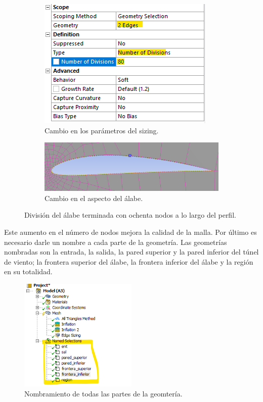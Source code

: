 \documentclass[12pt, letterpaper]{article}
\begin{document}
\begin{figure}[H]
	\centering
	\begin{subfigure}[b]{0.49\linewidth}
		\includegraphics[width=\linewidth]{14.png}
		\caption{Cambio en los parámetros del sizing.}
	\end{subfigure}
	\begin{subfigure}[b]{0.49\linewidth}
		\includegraphics[width=\linewidth]{15.png}
		\caption{Cambio en el aspecto del álabe.}
	\end{subfigure}
	\caption{División del álabe terminada con ochenta nodos a lo largo del perfil.}
\end{figure}

Este aumento en el número de nodos mejora la calidad de la malla. Por último es necesario darle un nombre a cada parte de la geometría. Las geometrías nombradas son la entrada, la salida, la pared superior y la pared inferior del túnel de viento; la frontera superior del álabe, la frontera inferior del álabe y la región en su totalidad.

\begin{figure}[H]
	\centering
	\includegraphics[width=0.5\textwidth]{16.png}
	\caption{Nombramiento de todas las partes de la geomtería.}
\end{figure}
\end{document}
